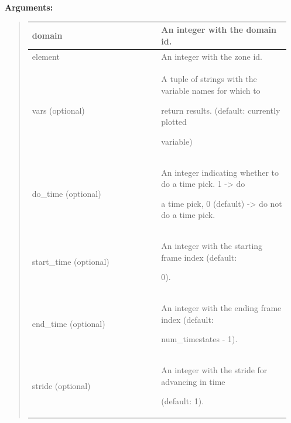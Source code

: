 \documentclass[letterpaper,10pt,english]{sphinxmanual}
\begin{document}
\begin{DUlineblock}{0em}
\item[] 
\item[] \textbf{Arguments:}
\end{DUlineblock}
\begin{quote}

\begin{tabular}{|p{0.475\linewidth}|p{0.475\linewidth}|}
\hline

domain
 & 
An integer with the domain id.
\\
\hline
element
 & 
An integer with the zone id.
\\
\hline
vars (optional)
 & 
\begin{DUlineblock}{0em}
\item[] A tuple of strings with the variable names for which to
\item[] return results. (default: currently plotted
\item[] variable)
\end{DUlineblock}
\\
\hline
do\_time (optional)
 & 
\begin{DUlineblock}{0em}
\item[] An integer indicating whether to do a time pick. 1 -\textgreater{} do
\item[] a time pick, 0 (default) -\textgreater{} do not do a time pick.
\end{DUlineblock}
\\
\hline
start\_time (optional)
 & 
\begin{DUlineblock}{0em}
\item[] An integer with the starting frame index (default:
\item[] 0).
\end{DUlineblock}
\\
\hline
end\_time (optional)
 & 
\begin{DUlineblock}{0em}
\item[] An integer with the ending frame index (default:
\item[] num\_timestates - 1).
\end{DUlineblock}
\\
\hline
stride (optional)
 & 
\begin{DUlineblock}{0em}
\item[] An integer with the stride for advancing in time
\item[] (default: 1).
\end{DUlineblock}
\\

\end{tabular}
\end{quote}
\end{document}
